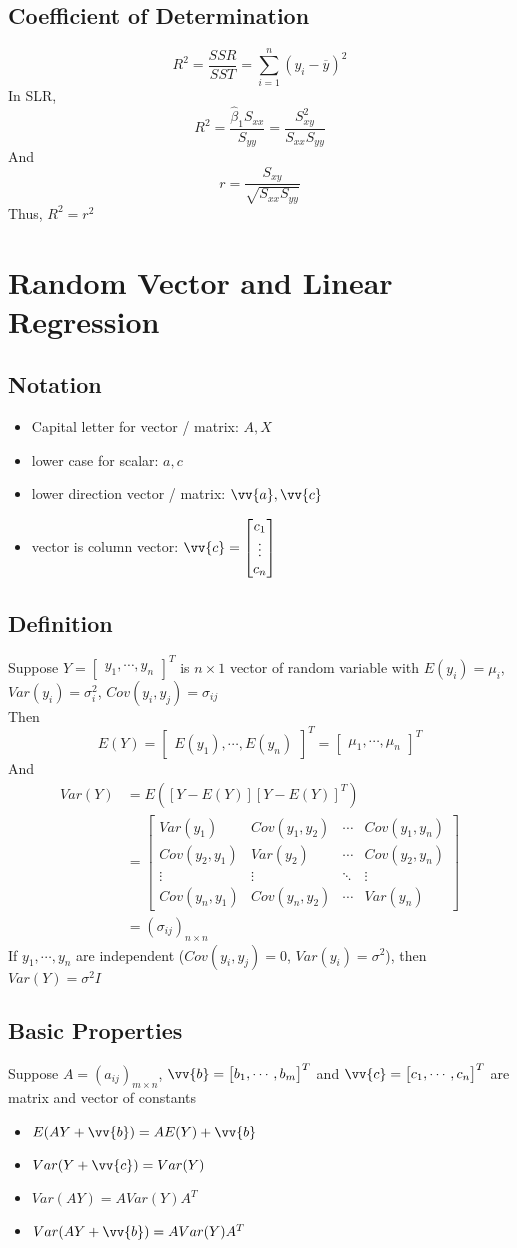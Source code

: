 \documentclass[11pt]{article}
\newcommand{\cv}[1]{\begin{bmatrix} #1 \end{bmatrix}}
\newcommand{\va}{\vv{a}}
\newcommand{\vb}{\vv{b}}
\newcommand{\vc}{\vv{c}}
\begin{document}
\subsection{Coefficient of Determination}
\[R^2=\frac{SSR}{SST}=\sum_{i=1}^{n}(y_i-\overline{y})^2\]
In SLR, \[R^2=\frac{\hat{\beta}_1S_{xx}}{S_{yy}} = \frac{S^2_{xy}}{S_{xx}S_{yy}}\]
And \[r = \frac{S_{xy}}{\sqrt{S_{xx}S_{yy}}}\]
Thus, $R^2=r^2$

\section{Random Vector and Linear Regression}
\subsection*{Notation}
\begin{itemize}
    \item Capital letter for vector / matrix: $A, X$
    \item lower case for scalar: $a, c$
    \item lower direction vector / matrix: $\va, \vc$
    \item vector is column vector: $\vc=\cv{c_1\\\vdots\\c_n}$
\end{itemize}
\subsection*{Definition}
Suppose $Y=\cv{y_1,\cdots,y_n}^T$ is $n\times 1$ vector of random variable with $E(y_i)=\mu_i$, $Var(y_i)=\sigma_i^2$, $Cov(y_i,y_j)=\sigma_{ij}$ \\
Then \[E(Y)=\cv{E(y_1),\cdots,E(y_n)}^T=\cv{\mu_1,\cdots,\mu_n}^T\]
And 
\begin{align*}
    Var(Y) &= E([Y-E(Y)][Y-E(Y)]^T) \\
           &= \cv{Var(y_1) &Cov(y_1,y_2) &\cdots &Cov(y_1,y_n) \\ Cov(y_2,y_1) &Var(y_2) &\cdots &Cov(y_2,y_n) \\ \vdots &\vdots &\ddots &\vdots \\ Cov(y_n,y_1) &Cov(y_n,y_2) &\cdots &Var(y_n)} \\
           &= (\sigma_{ij})_{n\times n}
\end{align*}
If $y_1,\cdots,y_n$ are independent ($Cov(y_i,y_j)=0$, $Var(y_i)=\sigma^2$), then $Var(Y)=\sigma^2I$
\subsection*{Basic Properties}
Suppose $A=(a_{ij})_{m\times n}$, $\vb=\cv{b_1,\cdots,b_m}^T$ and $\vc=\cv{c_1,\cdots,c_n}^T$ are matrix and vector of constants
\begin{itemize}
    \item $E(AY+\vb)=AE(Y)+\vb$
    \item $Var(Y+\vc)=Var(Y)$
    \item $Var(AY)=AVar(Y)A^T$
    \item $Var(AY+\vb)=AVar(Y)A^T$
\end{itemize}
\end{document}
